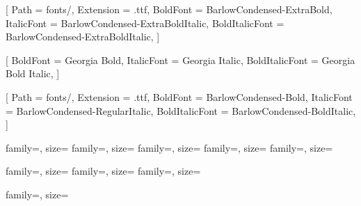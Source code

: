%
%
%

\usepackage{fontspec}


\newfontfamily{}[
  Path           = {fonts/},
  Extension      = {.ttf},
  BoldFont       = {BarlowCondensed-ExtraBold},
  ItalicFont     = {BarlowCondensed-ExtraBoldItalic},
  BoldItalicFont = {BarlowCondensed-ExtraBoldItalic},
]

\newfontfamily{}

\setmainfont{Georgia}[
  BoldFont       = {Georgia Bold},
  ItalicFont     = {Georgia Italic},
  BoldItalicFont = {Georgia Bold Italic},
]

\setsansfont{BarlowCondensed-Regular}[
  Path           = {fonts/},
  Extension      = {.ttf},
  BoldFont       = {BarlowCondensed-Bold},
  ItalicFont     = {BarlowCondensed-RegularItalic},
  BoldItalicFont = {BarlowCondensed-BoldItalic},
]



         {family=\uwheadline, size=\LARGE}
      {family=\uwheadline, size=\large}
    {family=\uwheadline, size=\large}
 {family=\uwheadline, size=\normalsize}
   {family=\uwheadline, size=\normalsize}

    {family=\rmfamily, size=\normalsize}
 {family=\rmfamily, size=\small}
      {family=\rmfamily, size=\small}

  {family=\sffamily, size=\tiny}
